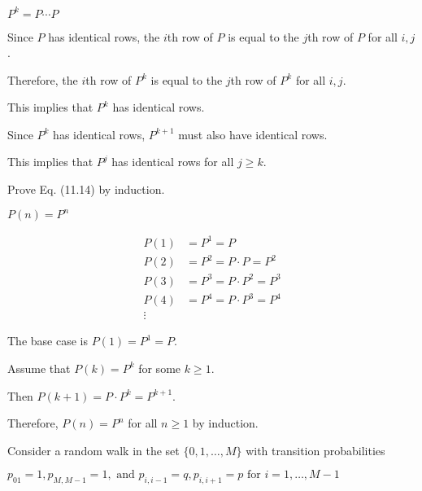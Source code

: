 \documentclass[answers]{exam}
\begin{document}
\begin{questions}
\begin{solution}
        \(P^k = P\cdots P\)

        Since \(P\) has identical rows, the \(i\)th row of \(P\) is equal to the
        \(j\)th row of \(P\) for all \(i, j\).

        Therefore, the \(i\)th row of \(P^k\) is equal to the \(j\)th row of \(P^k\)
        for all \(i, j\).

        This implies that \(P^k\) has identical rows.

        Since \(P^k\) has identical rows, \(P^{k+1}\) must also have identical rows.

        This implies that \(P^j\) has identical rows for all \(j \geq k\).
    \end{solution}


    Prove Eq. (11.14) by induction.

    \(P(n) = P^n\)
    \begin{solution}
        \begin{align*}
            P(1) & = P^1 = P                 \\
            P(2) & = P^2 = P \cdot P = P^2   \\
            P(3) & = P^3 = P \cdot P^2 = P^3 \\
            P(4) & = P^4 = P \cdot P^3 = P^4 \\
            \vdots
        \end{align*}

        The base case is \(P(1) = P^1 = P\).

        Assume that \(P(k) = P^k\) for some \(k \geq 1\).

        Then \(P(k+1) = P \cdot P^k = P^{k+1}\).

        Therefore, \(P(n) = P^n\) for all \(n \geq 1\) by induction.
    \end{solution}


    Consider a random walk in the set $\{0, 1, \dots, M\}$ with transition
    probabilities

    \(p_{01} = 1, p_{M, M - 1} = 1, \text{ and } p_{i, i - 1} = q, p_{i, i + 1} = p \text{ for } i = 1, \dots, M - 1\)
\end{questions}
\end{document}
